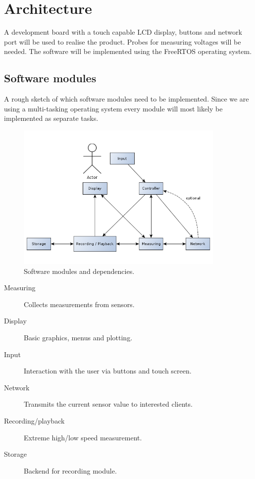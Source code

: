 \documentclass[a4paper]{report}
\begin{document}
\section*{Architecture}
A development board with a touch capable LCD display, buttons and network port
will be used to realise the product.
Probes for measuring voltages will be needed.
The software will be implemented using the FreeRTOS operating system.
\pagebreak
\subsection*{Software modules}
A rough sketch of which software modules need to be implemented. 
Since we are using a multi-tasking operating system every module
will most likely be implemented as separate tasks.
\begin{figure}[h!]
	\centering
	\includegraphics[width=0.9\textwidth]{software_modules.png}
	\caption{Software modules and dependencies.}
\end{figure}
\begin{description}
\item [Measuring] Collects measurements from sensors.
\item [Display] Basic graphics, menus and plotting.
\item [Input] Interaction with the user via buttons and touch screen.
\item [Network] Transmits the current sensor value to interested clients.
\item [Recording/playback] Extreme high/low speed measurement.
\item [Storage] Backend for recording module.
\end{description}
\end{document}
